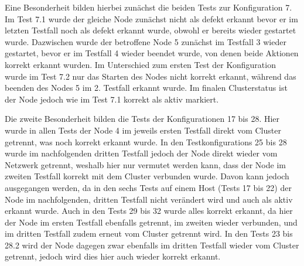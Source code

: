 Eine Besonderheit bilden hierbei zunächst die beiden \glspl{Test} zur Konfiguration 7.
Im \gls{Test} 7.1 wurde der gleiche Node zunächst nicht als defekt erkannt bevor er im letzten \gls{Testfall} noch als defekt erkannt wurde, obwohl er bereits wieder gestartet wurde.
Dazwischen wurde der betroffene Node 5 zunächst im \gls{Testfall} 3 wieder gestartet, bevor er im \gls{Testfall} 4 wieder beendet wurde, von denen beide Aktionen korrekt erkannt wurden.
Im Unterschied zum ersten \gls{Test} der Konfiguration wurde im \gls{Test} 7.2 nur das Starten des Nodes nicht korrekt erkannt, während das beenden des Nodes 5 im 2. \gls{Testfall} erkannt wurde.
Im finalen Clusterstatus ist der Node jedoch wie im \gls{Test} 7.1 korrekt als aktiv markiert.

Die zweite Besonderheit bilden die \glspl{Test} der Konfigurationen 17 bis 28.
Hier wurde in allen \glspl{Test} der Node 4 im jeweils ersten \gls{Testfall} direkt vom Cluster getrennt, was noch korrekt erkannt wurde.
In den \glspl{Testkonfiguration} 25 bis 28 wurde im nachfolgenden dritten \gls{Testfall} jedoch der Node direkt wieder vom Netzwerk getrennt, weshalb hier nur vermutet werden kann, dass der Node im zweiten \gls{Testfall} korrekt mit dem Cluster verbunden wurde.
Davon kann jedoch ausgegangen werden, da in den sechs \glspl{Test} auf einem Host (Tests 17 bis 22) der Node im nachfolgenden, dritten \gls{Testfall} nicht verändert wird und auch als aktiv erkannt wurde.
Auch in den \glspl{Test} 29 bis 32 wurde alles korrekt erkannt, da hier der Node im ersten \gls{Testfall} ebenfalls getrennt, im zweiten wieder verbunden, und im dritten \gls{Testfall} zudem erneut vom Cluster getrennt wird.
In den \glspl{Test} 23 bis 28.2 wird der Node dagegen zwar ebenfalls im dritten \gls{Testfall} wieder vom Cluster getrennt, jedoch wird dies hier auch wieder korrekt erkannt.

